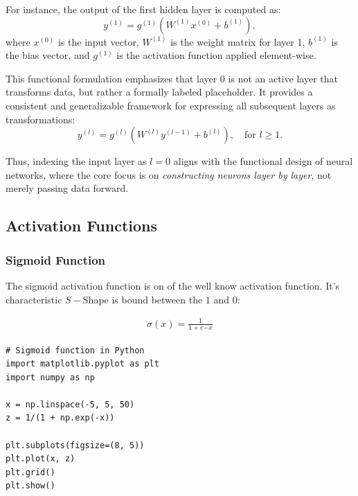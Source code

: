 \medskip

For instance, the output of the first hidden layer is computed as:
\[
y^{(1)} = g^{(1)}\left(W^{(1)} x^{(0)} + b^{(1)}\right),
\]
where \( x^{(0)} \) is the input vector, \( W^{(1)} \) is the weight matrix for layer 1, \( b^{(1)} \) is the bias vector, and \( g^{(1)} \) is the activation function applied element-wise.

\medskip

This functional formulation emphasizes that layer 0 is not an active layer that transforms data, but rather a formally labeled placeholder. It provides a consistent and generalizable framework for expressing all subsequent layers as transformations:
\[
y^{(l)} = g^{(l)}\left(W^{(l)} y^{(l-1)} + b^{(l)}\right), \quad \text{for } l \geq 1.
\]

\medskip

Thus, indexing the input layer as \( l = 0 \) aligns with the functional design of neural networks, where the core focus is on \emph{constructing neurons layer by layer}, not merely passing data forward.



\subsection{Activation Functions}
\subsubsection*{Sigmoid Function}
The sigmoid activation function is on of the well know activation function. It's characteristic $S-$Shape is bound between the $1$ and $0$:

\begin{align}
	\sigma(x) = \frac{1}{1+e{-x}}	
\end{align}


\begin{lstlisting}[language=iPython, caption={Example code to create a Sigmoid Function}]
# Sigmoid function in Python
import matplotlib.pyplot as plt
import numpy as np

x = np.linspace(-5, 5, 50)
z = 1/(1 + np.exp(-x))

plt.subplots(figsize=(8, 5))
plt.plot(x, z)
plt.grid()
plt.show()
\end{lstlisting}


